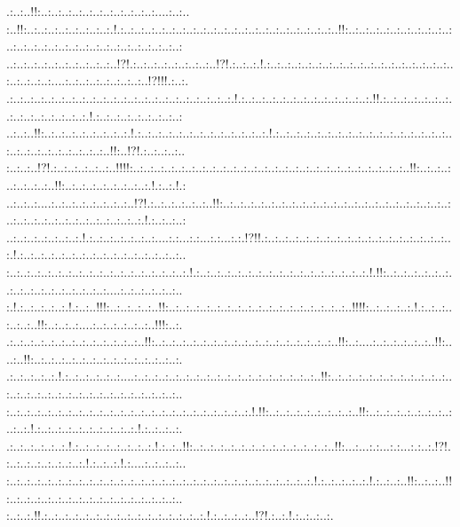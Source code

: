 \documentclass[paper=a4, fontsize=11pt]{scrartcl} %
\numberwithin{equation}{section} %
\numberwithin{figure}{section} %
\numberwithin{table}{section} %
\begin{document}
.:..:..!!:..:..:..:..:..:..:..:..:..:..:..:....:..:..\\:..!!:..:..:..:..:..:..:..:..:.!.:..:..:..:..:..:..:..:..:..:..:..:..:..:..:..:..:..:..:..:..:..!!:..:..:..:..:..:..:..:..:..:..:..:..:..:..:..:..:..:..:..:..:..:..:..:..:..:..:..:\\..:..:..:..:..:..:..:..:..:..:..!?!.:..:..:..:..:..:..:..:..!?!.:..:..:.!.:..:..:..:..:..:..:..:..:..:..:..:..:..:..:..:..:..:..:..:..:..:..:....:..:..:..:..:..:..:..:..!?!!!.:..:.\\.:..:..:..:..:..:..:..:..:..:..:..:..:..:..:..:..:..:..:..:..:..:.!.:..:..:..:..:..:..:..:..:..:..:..:..:.!!.:..:..:..:..:..:..:..:..:..:..:..:..:..:..:.!.:..:..:..:..:..:..:..:..:\\..:..:..!!:..:..:..:..:..:..:..:..:.!.:..:..:..:..:..:..:..:..:..:..:..:..:.!.:..:..:..:..:..:..:..:..:..:..:..:..:..:..:..:..:..:..:..:..:..:..:..:..:..:..:..!!:..!?!.:..:..:..:..\\:..:..:..!?!.:..:..:..:..:..:..!!!!:..:..:..:..:..:..:..:..:..:..:..:..:..:..:..:..:..:..:..:..:..:..:..:..:..:..:..!!:..:..:..:..:..:..:..:..!!:..:..:..:..:..:..:..:..:.!.:..:.!.:\\..:..:..:....:..:..:..:..:..:..:..:..!?!.:..:..:..:..:..:..!!:..:..:..:..:..:..:..:..:..:..:..:..:..:..:..:..:..:..:..:..:..:..:..:..:..:..:..:..:..:..:..:..:..:..:..:.!.:..:..:..:\\..:..:..:..:..:..:..:.!.:..:..:..:..:..:..:....:.:...:.:...:.:...:.:.!?!!.:..:..:..:..:..:..:..:..:..:..:..:..:..:..:..:..:..:..:.!.:..:..:..:..:..:..:..:..:..:..:..:..:..:..:..:..\\:..:..:..:..:..:..:..:..:..:..:..:..:..:..:..:..:..:.!.:..:..:..:..:..:..:..:..:..:..:..:..:..:..:..:..:.!.!!:..:..:..:..:..:..:..:..:..:..:..:..:..:..:..:..:....:..:..:..:..:..:..\\:.!.:..:..:..:..:.!.:..:..!!!:..:..:..:..:..!!:..:..:..:..:..:..:..:..:..:..:..:..:..:..:..:..:..:..!!!!:..:..:..:..:.!.:..:..:..:..:..:..!!:..:..:..:....:..:..:..:..:..:..!!!:..:.\\.:..:..:..:..:..:..:..:..:..:..:..:..:..!!:..:..:..:..:..:..:..:..:..:..:..:..:..:..:..:..:..:..!!:..:....:..:..:..:..:..:..!!:....:..!!:..:..:..:..:..:..:..:..:..:..:..:..:..:..:.\\.:..:..:..:..:.!.:..:..:..:..:..:....:..:..:..:..:..:..:..:..:..:..:..:..:..:..:..:..:..:..!!:..:..:..:..:..:..:..:..:..:..:..:..:..:..:..:..:..:..:..:..:..:..:..:..:..:..:..:..:..\\:..:..:..:..:..:..:..:..:..:..:..:..:..:..:..:..:..:..:..:..:..:..:..:.!.!!:..:..:..:..:..:..:..:..:..!!:..:..:..:..:..:..:..:..:..:..:.!.:..:..:..:..:..:..:..:..:..:.!.:..:..:..:.\\.:..:..:..:..:..:.!.:..:..:..:..:..:..:..:.!.:..:..!!:..:..:..:..:..:..:..:..:..:..:..:..:..:..!!:...:...:.:...:.:...:.:..:.!?!.:..:..:..:..:..:..:..:.!.:..:..:.!.:....:..:..:..:..\\:..:..:..:..:..:..:..:..:..:..:..:..:..:..:..:..:..:..:..:..:..:..:..:..:..:..:..:..:..:.!.:..:..:..:..:.!.:..:..:..!!:..:..:..!!:..:..:..:..:..:..:..:..:..:..:..:..:..:..:..:..:..\\:..:..:.!!.:..:..:..:..:..:..:..:..:..:..:..:..:..:..:..:.!.:..:..:..:..!?!.:..:.!.:..:..:..:.
\end{document}
